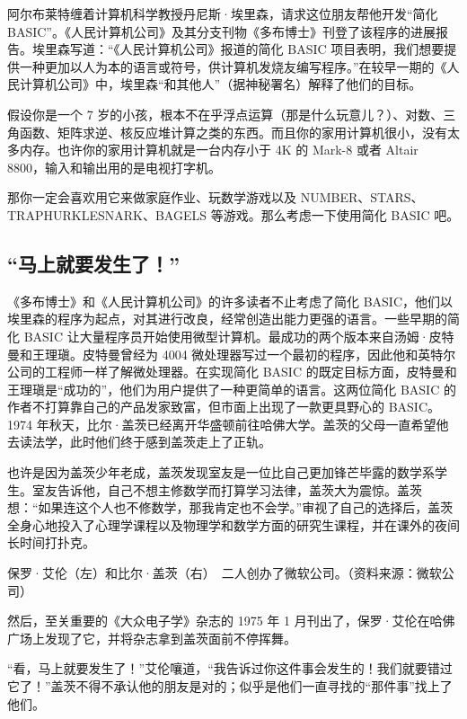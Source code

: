 \documentclass[12pt,UTF8]{ctexbook}
\begin{document}
阿尔布莱特缠着计算机科学教授丹尼斯·埃里森，请求这位朋友帮他开发“简化 BASIC”。《人民计算机公司》及其分支刊物《多布博士》刊登了该程序的进展报告。埃里森写道：“《人民计算机公司》报道的简化 BASIC 项目表明，我们想要提供一种更加以人为本的语言或符号，供计算机发烧友编写程序。”在较早一期的《人民计算机公司》中，埃里森“和其他人”（据神秘署名）解释了他们的目标。

假设你是一个 7 岁的小孩，根本不在乎浮点运算（那是什么玩意儿？）、对数、三角函数、矩阵求逆、核反应堆计算之类的东西。而且你的家用计算机很小，没有太多内存。也许你的家用计算机就是一台内存小于 4K 的 Mark-8 或者 Altair 8800，输入和输出用的是电视打字机。

那你一定会喜欢用它来做家庭作业、玩数学游戏以及 NUMBER、STARS、TRAPHURKLESNARK、BAGELS 等游戏。那么考虑一下使用简化 BASIC 吧。





\subsection{“马上就要发生了！”}


《多布博士》和《人民计算机公司》的许多读者不止考虑了简化 BASIC，他们以埃里森的程序为起点，对其进行改良，经常创造出能力更强的语言。一些早期的简化 BASIC 让大量程序员开始使用微型计算机。最成功的两个版本来自汤姆·皮特曼和王理瑱。皮特曼曾经为 4004 微处理器写过一个最初的程序，因此他和英特尔公司的工程师一样了解微处理器。在实现简化 BASIC 的既定目标方面，皮特曼和王理瑱是“成功的”，他们为用户提供了一种更简单的语言。这两位简化 BASIC 的作者不打算靠自己的产品发家致富，但市面上出现了一款更具野心的 BASIC。1974 年秋天，比尔·盖茨已经离开华盛顿前往哈佛大学。盖茨的父母一直希望他去读法学，此时他们终于感到盖茨走上了正轨。

也许是因为盖茨少年老成，盖茨发现室友是一位比自己更加锋芒毕露的数学系学生。室友告诉他，自己不想主修数学而打算学习法律，盖茨大为震惊。盖茨想：“如果连这个人也不修数学，那我肯定也不会学。”审视了自己的选择后，盖茨全身心地投入了心理学课程以及物理学和数学方面的研究生课程，并在课外的夜间长时间打扑克。



保罗·艾伦（左）和比尔·盖茨（右）　二人创办了微软公司。（资料来源：微软公司）

然后，至关重要的《大众电子学》杂志的 1975 年 1 月刊出了，保罗·艾伦在哈佛广场上发现了它，并将杂志拿到盖茨面前不停挥舞。

“看，马上就要发生了！”艾伦嚷道，“我告诉过你这件事会发生的！我们就要错过它了！”盖茨不得不承认他的朋友是对的；似乎是他们一直寻找的“那件事”找上了他们。
\end{document}
